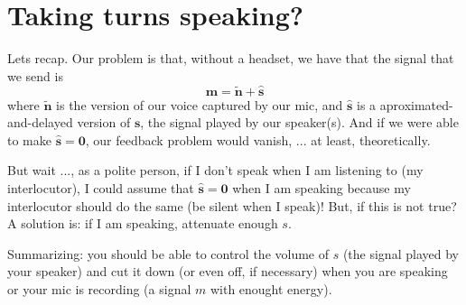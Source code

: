 \section{Taking turns speaking?}
Lets recap. Our problem is that, without a headset, we have that the
signal that we send is
\begin{equation}
    \mathbf{m} = \tilde{\mathbf{n}} + \hat{\mathbf{s}}
\end{equation}
where $\tilde{\mathbf{n}}$ is the version of our voice captured by our
mic, and $\hat{\mathbf{s}}$ is a aproximated-and-delayed version of
$\mathbf{s}$, the signal played by our speaker(s). And if we were able
to make $\hat{\mathbf{s}}=\mathbf{0}$, our feedback problem would
vanish, ... at least, theoretically.

But wait ..., as a polite person, if I don't speak when I am listening
to (my interlocutor), I could assume that
$\hat{\mathbf{s}}=\mathbf{0}$ when I am speaking because my
interlocutor should do the same (be silent when I speak)! But, if this
is not true? A solution is: if I am speaking, attenuate enough $s$. 

Summarizing: you should be able to control the volume of $s$ (the
signal played by your speaker) and cut it down (or even off, if
necessary) when you are speaking or your mic is recording (a signal
$m$ with enought energy).

